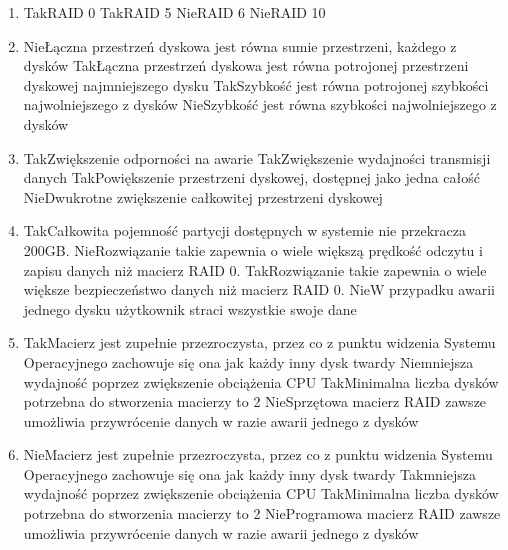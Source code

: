 \begin{enumerate}
		\newpage
		\item {}%
		{Tak}{RAID 0}%
		{Tak}{RAID 5}%
		{Nie}{RAID 6}%
		{Nie}{RAID 10}
		\item {}%
		{Nie}{Łączna przestrzeń dyskowa jest równa sumie przestrzeni, każdego z dysków}%
		{Tak}{Łączna przestrzeń dyskowa jest równa potrojonej przestrzeni dyskowej najmniejszego dysku}%
		{Tak}{Szybkość jest równa potrojonej szybkości najwolniejszego z dysków}%
		{Nie}{Szybkość jest równa szybkości najwolniejszego z dysków}
		\item {}%
		{Tak}{Zwiększenie odporności na awarie}%
		{Tak}{Zwiększenie wydajności transmisji danych}%
		{Tak}{Powiększenie przestrzeni dyskowej, dostępnej jako jedna całość}%
		{Nie}{Dwukrotne zwiększenie całkowitej przestrzeni dyskowej}
		\item {}%
		{Tak}{Całkowita pojemność partycji dostępnych w systemie nie przekracza 200GB.}%
		{Nie}{Rozwiązanie takie zapewnia o wiele większą prędkość odczytu i zapisu danych niż macierz RAID 0.}%
		{Tak}{Rozwiązanie takie zapewnia o wiele większe bezpieczeństwo danych niż macierz RAID 0.}%
		{Nie}{W przypadku awarii jednego dysku użytkownik straci wszystkie swoje dane}
		\item {}%
		{Tak}{Macierz jest zupełnie przezroczysta, przez co z punktu widzenia Systemu Operacyjnego zachowuje się ona jak każdy inny dysk twardy}%
		{Nie}{mniejsza wydajność poprzez zwiększenie obciążenia CPU}%
		{Tak}{Minimalna liczba dysków potrzebna do stworzenia macierzy to 2}%
		{Nie}{Sprzętowa macierz RAID zawsze umożliwia przywrócenie danych w razie awarii jednego z dysków}
		\item {}%
		{Nie}{Macierz jest zupełnie przezroczysta, przez co z punktu widzenia Systemu Operacyjnego zachowuje się ona jak każdy inny dysk twardy}%
		{Tak}{mniejsza wydajność poprzez zwiększenie obciążenia CPU}%
		{Tak}{Minimalna liczba dysków potrzebna do stworzenia macierzy to 2}%
		{Nie}{Programowa macierz RAID zawsze umożliwia przywrócenie danych w razie awarii jednego z dysków}
		

\end{enumerate}
